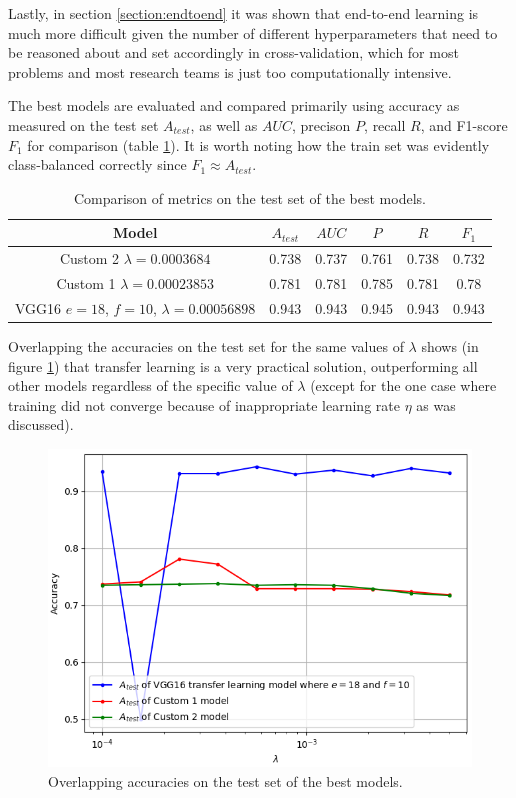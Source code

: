 Lastly, in section \ref{section:endtoend} it was shown that end-to-end learning is much more difficult given the number of different hyperparameters that need to be reasoned about and set accordingly in cross-validation, which for most problems and most research teams is just too computationally intensive.

The best models are evaluated and compared primarily using accuracy as measured on the test set $A_{test}$, as well as $AUC$, precison $P$, recall $R$, and F1-score $F_1$ for comparison (table \ref{table:comparison}). It is worth noting how the train set was evidently class-balanced correctly since $F_1 \approx A_{test}$.

\begin{table}[ht]
\centering
\begin{tabular}{ |c|c|c|c|c|c| }
\hline
Model & $A_{test}$ & $AUC$ & $P$ & $R$ & $F_1$ \\
\hline
Custom 2 $\lambda = 0.0003684$                   & 0.738 & 0.737 & 0.761 & 0.738 & 0.732 \\
Custom 1 $\lambda = 0.00023853$                  & 0.781 & 0.781 & 0.785 & 0.781 & 0.78  \\
VGG16 $e = 18$, $f = 10$, $\lambda = 0.00056898$ & 0.943 & 0.943 & 0.945 & 0.943 & 0.943 \\
\hline
\end{tabular}
\caption{Comparison of metrics on the test set of the best models.}
\label{table:comparison}
\end{table}

Overlapping the accuracies on the test set for the same values of $\lambda$ shows (in figure \ref{fig:comparison}) that transfer learning is a very practical solution, outperforming all other models regardless of the specific value of $\lambda$ (except for the one case where training did not converge because of inappropriate learning rate $\eta$ as was discussed).

\begin{figure}[ht]
    \centering
    \includegraphics[width=1.0\textwidth]{figs/comparison.png}
    \caption{Overlapping accuracies on the test set of the best models.}
    \label{fig:comparison}
\end{figure}

